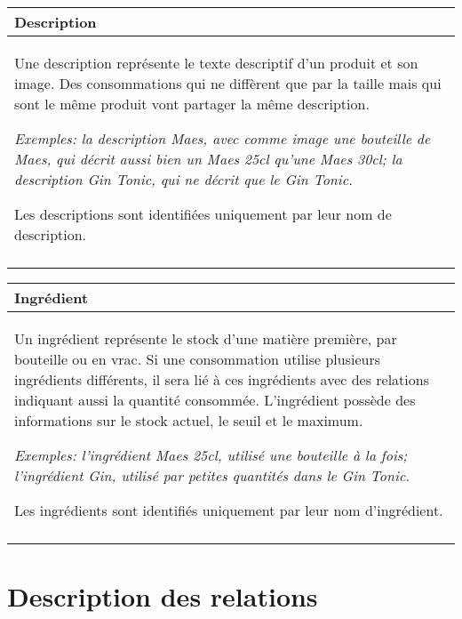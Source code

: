 \documentclass[a4paper,10pt]{article}
\begin{document}
\begin{tabu}{X}
\textbf{Description} \\
\toprule

Une description représente le texte descriptif d'un produit et son image. Des consommations qui ne diffèrent que par la taille mais qui sont le même produit vont partager la même description.

\textsl{Exemples: la description Maes, avec comme image une bouteille de Maes, qui décrit aussi bien un Maes 25cl qu'une Maes 30cl; la description Gin Tonic, qui ne décrit que le Gin Tonic.}

Les descriptions sont identifiées uniquement par leur nom de description. \\\\
\end{tabu}

\begin{tabu}{X}
\textbf{Ingrédient} \\
\toprule

Un ingrédient représente le stock d'une matière première, par bouteille ou en vrac. Si une consommation utilise plusieurs ingrédients différents, il sera lié à ces ingrédients avec des relations indiquant aussi la quantité consommée. L'ingrédient possède des informations sur le stock actuel, le seuil et le maximum.

\textsl{Exemples: l'ingrédient Maes 25cl, utilisé une bouteille à la fois; l'ingrédient Gin, utilisé par petites quantités dans le Gin Tonic.}

Les ingrédients sont identifiés uniquement par leur nom d'ingrédient. \\\\
\end{tabu}

\section{Description des relations}
\end{document}
